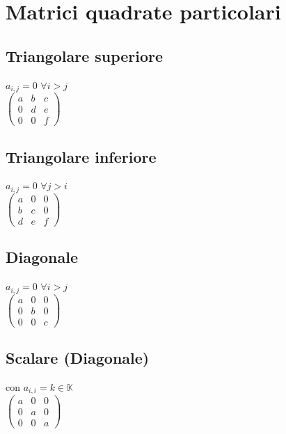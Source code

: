 \documentclass[a4paper, twoside, italian, 11pt]{book}
\newcommand{\K}{\mathbb{K}}
\begin{document}
\section{Matrici quadrate particolari}


\subsection{Triangolare superiore}

$a_{i,j} = 0$ $\forall i > j$ \\

\noindent
$\begin{pmatrix}
a & b & c \\
0 & d & e \\
0 & 0 & f
\end{pmatrix}$


\subsection{Triangolare inferiore}

$a_{i,j} = 0$ $\forall j > i$ \\

\noindent
$\begin{pmatrix}
a & 0 & 0 \\
b & c & 0 \\
d & e & f
\end{pmatrix}$


\subsection{Diagonale}

$a_{i,j} = 0$ $\forall i > j$ \\

\noindent
$\begin{pmatrix}
a & 0 & 0 \\
0 & b & 0 \\
0 & 0 & c
\end{pmatrix}$


\subsection{Scalare (Diagonale)}

con $a_{i,i} = k \in \K$ \\

\noindent
$\begin{pmatrix}
a & 0 & 0 \\
0 & a & 0 \\
0 & 0 & a
\end{pmatrix}$
\end{document}
